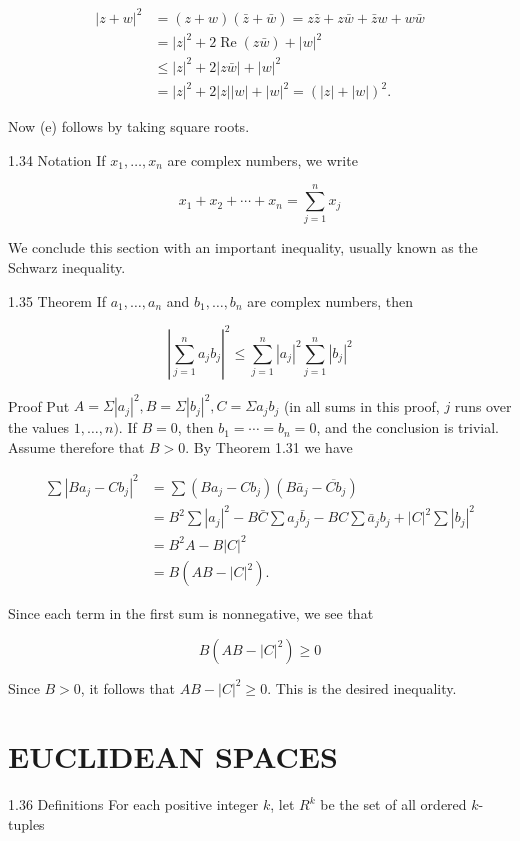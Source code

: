 \documentclass[10pt]{article}
\begin{document}
$$
\begin{aligned}
|z+w|^{2} & =(z+w)(\bar{z}+\bar{w})=z \bar{z}+z \bar{w}+\bar{z} w+w \bar{w} \\
& =|z|^{2}+2 \operatorname{Re}(z \bar{w})+|w|^{2} \\
& \leq|z|^{2}+2|z \bar{w}|+|w|^{2} \\
& =|z|^{2}+2|z||w|+|w|^{2}=(|z|+|w|)^{2} .
\end{aligned}
$$

Now (e) follows by taking square roots.

1.34 Notation If $x_{1}, \ldots, x_{n}$ are complex numbers, we write

$$
x_{1}+x_{2}+\cdots+x_{n}=\sum_{j=1}^{n} x_{j}
$$

We conclude this section with an important inequality, usually known as the Schwarz inequality.

1.35 Theorem If $a_{1}, \ldots, a_{n}$ and $b_{1}, \ldots, b_{n}$ are complex numbers, then

$$
\left|\sum_{j=1}^{n} a_{j} b_{j}\right|^{2} \leq \sum_{j=1}^{n}\left|a_{j}\right|^{2} \sum_{j=1}^{n}\left|b_{j}\right|^{2}
$$

Proof Put $A=\Sigma\left|a_{j}\right|^{2}, B=\Sigma\left|b_{j}\right|^{2}, C=\Sigma a_{j} b_{j}$ (in all sums in this proof, $j$ runs over the values $1, \ldots, n)$. If $B=0$, then $b_{1}=\cdots=b_{n}=0$, and the conclusion is trivial. Assume therefore that $B>0$. By Theorem 1.31 we have

$$
\begin{aligned}
\sum\left|B a_{j}-C b_{j}\right|^{2} & =\sum\left(B a_{j}-C b_{j}\right)\left(B \bar{a}_{j}-\overline{C b}_{j}\right) \\
& =B^{2} \sum\left|a_{j}\right|^{2}-B \bar{C} \sum a_{j} \bar{b}_{j}-B C \sum \bar{a}_{j} b_{j}+|C|^{2} \sum\left|b_{j}\right|^{2} \\
& =B^{2} A-B|C|^{2} \\
& =B\left(A B-|C|^{2}\right) .
\end{aligned}
$$

Since each term in the first sum is nonnegative, we see that

$$
B\left(A B-|C|^{2}\right) \geq 0
$$

Since $B>0$, it follows that $A B-|C|^{2} \geq 0$. This is the desired inequality.

\section{EUCLIDEAN SPACES}
1.36 Definitions For each positive integer $k$, let $R^{k}$ be the set of all ordered $k$-tuples
\end{document}
